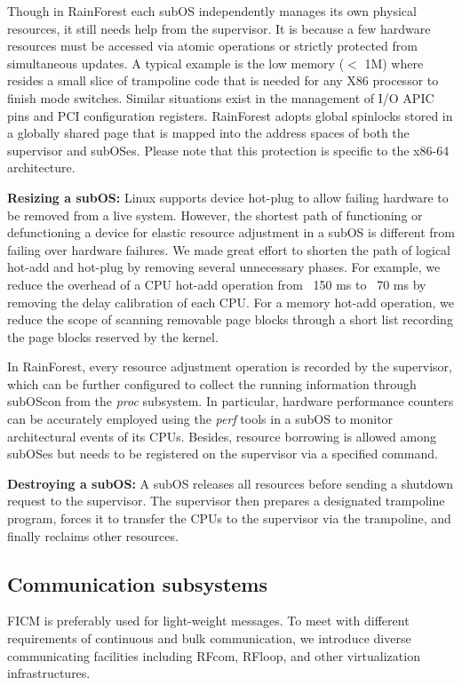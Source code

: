 \documentclass[pageno]{jpaper}
\begin{document}
Though in RainForest each subOS independently manages its own physical resources, it still needs help from the supervisor. It is because a few hardware resources must be accessed via atomic operations or strictly protected from simultaneous updates. A typical example is the low memory ($<$ 1M) where resides a small slice of trampoline code that is needed for any X86 processor to finish mode switches.
Similar situations exist in the management of I/O APIC pins and PCI configuration registers. RainForest adopts global spinlocks stored in a globally shared page that is mapped into the address spaces of both the supervisor and subOSes.
Please note that this protection is specific to the x86-64 architecture.



\textbf{Resizing a subOS:}
Linux supports device hot-plug to allow failing hardware to be removed from a live system. However,  the shortest path of functioning or defunctioning a device for elastic resource adjustment in a subOS  is different from failing over hardware failures. We made great effort to shorten the path of logical hot-add and
hot-plug by removing several unnecessary phases. For example, we reduce the overhead of a CPU hot-add operation from ~150 ms to ~70 ms by removing the delay calibration of each CPU. For a memory hot-add operation, we reduce the scope of scanning removable page blocks through a short list recording the page blocks reserved by the kernel.

In RainForest, every resource adjustment operation is recorded by the supervisor, which can be further configured to collect the running information through subOScon from the \emph{proc} subsystem. In particular, hardware performance counters can be accurately employed using the \emph{perf} tools in a subOS to monitor architectural events of its CPUs. Besides, resource borrowing is allowed among subOSes but needs to be registered on the supervisor via a specified command.


\textbf{Destroying a subOS:} A subOS releases all resources before sending a shutdown request to the supervisor. The supervisor then prepares a designated trampoline program, forces it to transfer the CPUs to the supervisor via the trampoline, and finally reclaims other resources.





\subsection{Communication subsystems}\label{communication}
FICM is preferably used for light-weight messages.
To meet with different requirements of continuous and bulk communication, we introduce diverse communicating facilities including RFcom, RFloop, and other virtualization infrastructures.
\end{document}
